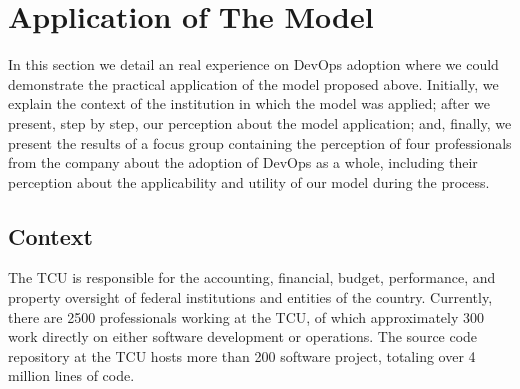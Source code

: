 \section{Application of The Model} \label{sec:TCU}

{
\color{blue}
In this section we detail an real experience on DevOps adoption where we could
demonstrate the practical application of the model proposed above. Initially,
we explain the context of the institution in which the model was applied; after
we present, step by step, our perception about the model application; and,
finally, we present the results of a focus group containing the perception of
four professionals from the company about the adoption of DevOps as a whole,
including their perception about the applicability and utility of our model
during the process.
}

\subsection{Context}

The TCU is responsible for the accounting, financial, budget, performance, and property
oversight of federal institutions and entities of the country. Currently, there are 2500
professionals working at the TCU, of which approximately 300 work directly on either
software development or operations. The source code repository at the TCU hosts
more than 200 software project, totaling over 4 million lines of code.

